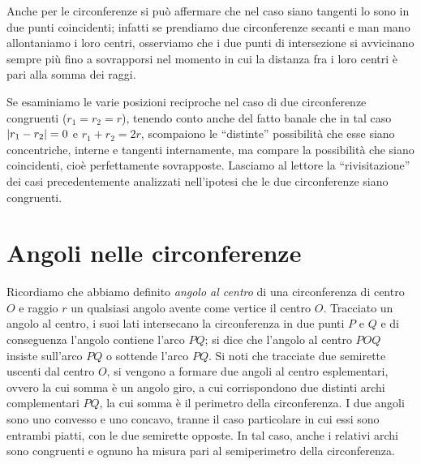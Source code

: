 
Anche per le circonferenze si può affermare che nel caso siano tangenti lo sono in due punti coincidenti; infatti se prendiamo due circonferenze secanti e man mano allontaniamo i loro centri, osserviamo che i due punti di intersezione si avvicinano sempre più fino a sovrapporsi nel momento in cui la distanza fra i loro centri è pari alla somma dei raggi.


Se esaminiamo le varie posizioni reciproche nel caso di due circonferenze congruenti ($r_1 = r_2 = r$), tenendo conto anche del fatto banale che in tal caso $\left|r_1 - r_2\right| = 0$ e $r_1 + r_2 = 2r$, scompaiono le ``distinte'' possibilità che esse siano concentriche, interne e tangenti internamente, ma compare la possibilità che siano coincidenti, cioè perfettamente sovrapposte.
Lasciamo al lettore la ``rivisitazione'' dei casi precedentemente analizzati nell'ipotesi che le due circonferenze siano congruenti.

\section{Angoli nelle circonferenze}

Ricordiamo che abbiamo definito \emph{angolo al centro} di una circonferenza di centro $O$ e raggio $r$ un qualsiasi angolo avente come vertice il centro $O$.
Tracciato un angolo al centro, i suoi lati intersecano la circonferenza in due punti $P$ e $Q$ e di conseguenza l'angolo contiene l'arco $PQ$; si dice che l'angolo al centro $POQ$ insiste sull'arco $PQ$ o sottende l'arco $PQ$.
Si noti che tracciate due semirette uscenti dal centro $O$, si vengono a formare due angoli al centro esplementari, ovvero la cui somma è un angolo giro, a cui corrispondono due distinti archi complementari $PQ$, la cui somma è il perimetro della circonferenza. 
I due angoli sono uno convesso e uno concavo, tranne il caso particolare in cui essi sono entrambi piatti, con le due semirette opposte. In tal caso, anche i relativi archi sono congruenti e ognuno ha misura pari al semiperimetro della circonferenza.

